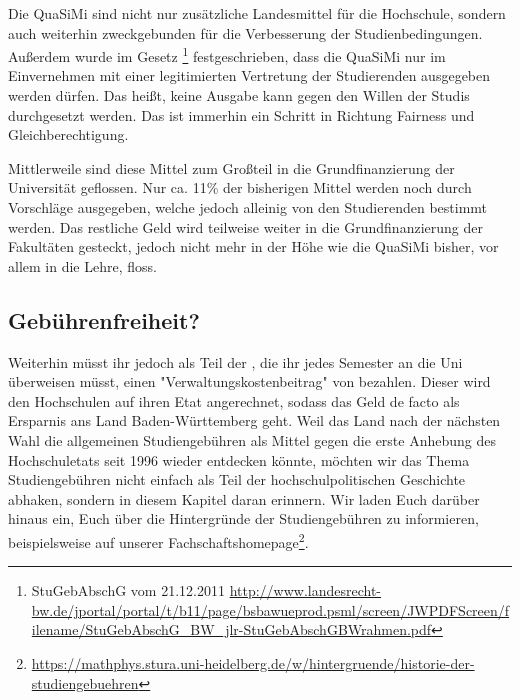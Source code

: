 Die QuaSiMi sind nicht nur zusätzliche Landesmittel für die Hochschule, sondern auch weiterhin zweckgebunden für die Verbesserung der Studienbedingungen. Außerdem wurde im Gesetz \footnote{StuGebAbschG vom 21.12.2011 \url{http://www.landesrecht-bw.de/jportal/portal/t/b11/page/bsbawueprod.psml/screen/JWPDFScreen/filename/StuGebAbschG\_BW\_jlr-StuGebAbschGBWrahmen.pdf}} festgeschrieben, dass die QuaSiMi nur im Einvernehmen mit einer legitimierten Vertretung der Studierenden ausgegeben werden dürfen. Das heißt, keine Ausgabe kann gegen den Willen der Studis durchgesetzt werden. Das ist immerhin ein Schritt in Richtung Fairness und Gleichberechtigung.

Mittlerweile sind diese Mittel zum Großteil in die Grundfinanzierung der Universität geflossen. Nur ca. 11\% der bisherigen Mittel werden noch durch Vorschläge ausgegeben, welche jedoch alleinig von den Studierenden bestimmt werden. Das restliche Geld wird teilweise weiter in die Grundfinanzierung der Fakultäten gesteckt, jedoch nicht mehr in der Höhe wie die QuaSiMi bisher, vor allem in die Lehre, floss.

\subsection{Gebührenfreiheit?}
Weiterhin müsst ihr jedoch als Teil der \EUR{\beitragssumme}, die ihr jedes Semester an die Uni überweisen müsst, einen "Verwaltungskostenbeitrag" von \EUR{\verwaltungsbetrag} bezahlen. Dieser wird den Hochschulen auf ihren Etat angerechnet, sodass das Geld de facto als Ersparnis ans Land Baden-Württemberg geht. Weil das Land nach der nächsten Wahl die allgemeinen Studiengebühren als Mittel gegen die erste Anhebung des Hochschuletats seit 1996 wieder entdecken könnte, möchten wir das Thema Studiengebühren nicht einfach als Teil der hochschulpolitischen Geschichte abhaken, sondern in diesem Kapitel daran erinnern. Wir laden Euch darüber hinaus ein, Euch über die Hintergründe der Studiengebühren zu informieren, beispielsweise auf unserer Fachschaftshomepage\footnote{\url{https://mathphys.stura.uni-heidelberg.de/w/hintergruende/historie-der-studiengebuehren}}.

